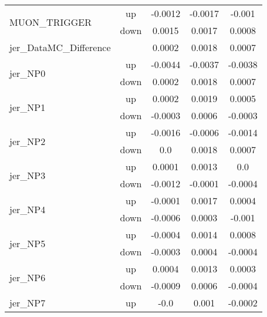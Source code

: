 \begin{table}[h!]
\begin{tabular}{lcccc}
\multirow{2}{*}{MUON\_TRIGGER}      & up   &     -0.0012     &     -0.0017     &     -0.001      \\
                                       & down &     0.0015     &     0.0017     &     0.0008       \\ \hline
\multirow{2}{*}{jer\_DataMC\_Difference}  &  & \multirow{2}{*}{0.0002} & \multirow{2}{*}{0.0018}  & \multirow{2}{*}{0.0007}  \\  \\ \hline
\multirow{2}{*}{jer\_NP0}      & up   &     -0.0044     &     -0.0037     &     -0.0038      \\
                                       & down &     0.0002     &     0.0018     &     0.0007       \\ \hline
\multirow{2}{*}{jer\_NP1}      & up   &     0.0002     &     0.0019     &     0.0005      \\
                                       & down &     -0.0003     &     0.0006     &     -0.0003       \\ \hline
\multirow{2}{*}{jer\_NP2}      & up   &     -0.0016     &     -0.0006     &     -0.0014      \\
                                       & down &     0.0     &     0.0018     &     0.0007       \\ \hline
\multirow{2}{*}{jer\_NP3}      & up   &     0.0001     &     0.0013     &     0.0      \\
                                       & down &     -0.0012     &     -0.0001     &     -0.0004       \\ \hline
\multirow{2}{*}{jer\_NP4}      & up   &     -0.0001     &     0.0017     &     0.0004      \\
                                       & down &     -0.0006     &     0.0003     &     -0.001       \\ \hline
\multirow{2}{*}{jer\_NP5}      & up   &     -0.0004     &     0.0014     &     0.0008      \\
                                       & down &     -0.0003     &     0.0004     &     -0.0004       \\ \hline
\multirow{2}{*}{jer\_NP6}      & up   &     0.0004     &     0.0013     &     0.0003      \\
                                       & down &     -0.0009     &     0.0006     &     -0.0004       \\ \hline
\multirow{2}{*}{jer\_NP7}      & up   &     -0.0     &     0.001     &     -0.0002      \\

\end{tabular}
\end{table}
